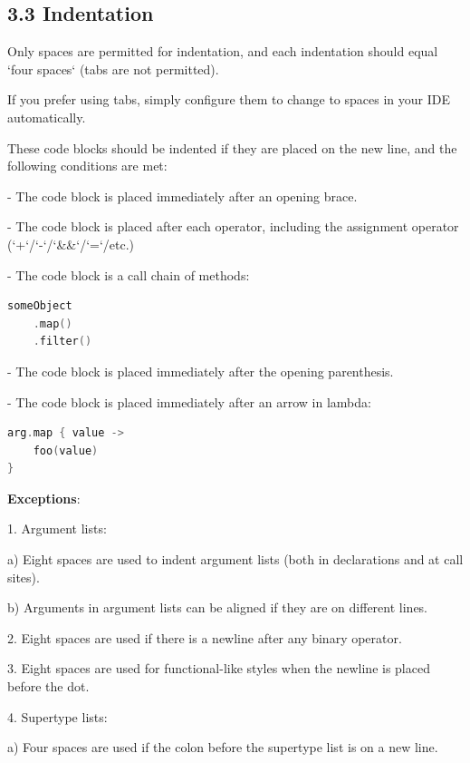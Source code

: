 \subsection*{\textbf{3.3 Indentation}}

\label{sec:3.3}



Only spaces are permitted for indentation, and each indentation should equal `four spaces` (tabs are not permitted).

If you prefer using tabs, simply configure them to change to spaces in your IDE automatically.

These code blocks should be indented if they are placed on the new line, and the following conditions are met:

-	The code block is placed immediately after an opening brace.

-	The code block is placed after each operator, including the assignment operator (`+`/`-`/`\&\&`/`=`/etc.)

-	The code block is a call chain of methods:

\begin{lstlisting}[language=Kotlin]
someObject
    .map()
    .filter()
\end{lstlisting}
-  The code block is placed immediately after the opening parenthesis.

-  The code block is placed immediately after an arrow in lambda:



\begin{lstlisting}[language=Kotlin]
arg.map { value ->
    foo(value)
}
\end{lstlisting}
    

\textbf{Exceptions}:

1.	Argument lists: \

a) Eight spaces are used to indent argument lists (both in declarations and at call sites). \

b) Arguments in argument lists can be aligned if they are on different lines. 



2.	Eight spaces are used if there is a newline after any binary operator.



3.	Eight spaces are used for functional-like styles when the newline is placed before the dot.



4.	Supertype lists: \

a) Four spaces are used if the colon before the supertype list is on a new line. \

